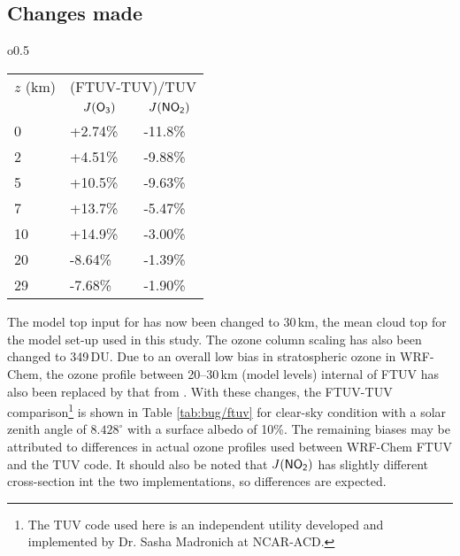 \subsection{Changes made}\label{a-ssec:bug/ftuv/fix}
	\begin{wraptable}{o}{0.5\textwidth}
	\vspace{-.5in}
		\begin{singlespacing}
		\caption{Compaison of photolysis rates from FTUV and TUV.}
		\centering
		\begin{tabular}{p{}|p{}p{}} \hline
		$z$ (\unit{km}) & \multicolumn{2}{c}{(FTUV-TUV)/TUV} \\ 
		 & \multicolumn{1}{c}{$J(\chem{O_3})$} & \multicolumn{1}{c}{$J(\chem{NO_2})$} \\ \hline\hline
		0	& +2.74\% & -11.8\% \\
		2	& +4.51\% & -9.88\% \\
		5	& +10.5\% & -9.63\% \\
		7	& +13.7\% & -5.47\% \\
		10	& +14.9\% & -3.00\% \\
		20	& -8.64\% & -1.39\% \\
		29	& -7.68\% & -1.90\% \\ \hline
		\end{tabular}
		\label{tab:bug/ftuv}
		\end{singlespacing}
	\vspace{-.3in}
	\end{wraptable}

The model top input for  has now been changed to 30\,\unit{km}, the mean cloud top for the model set-up used in this study. The ozone column scaling has also been changed to 349\,\unit{DU}. Due to an overall low bias in stratospheric ozone in WRF-Chem, the ozone profile between 20--30\,\unit{km} (model levels) internal of FTUV has also been replaced by that from . With these changes, the FTUV-TUV comparison\footnote{The TUV code used here is an independent utility developed and implemented by Dr. Sasha Madronich at NCAR-ACD.} is shown in Table \ref{tab:bug/ftuv} for clear-sky condition with a solar zenith angle of $8.428^\circ$ with a surface albedo of 10\%. The remaining biases may be attributed to differences in actual ozone profiles used between WRF-Chem FTUV and the TUV code. It should also be noted that $J(\chem{NO_2})$ has slightly different cross-section int the two implementations, so differences are expected.

